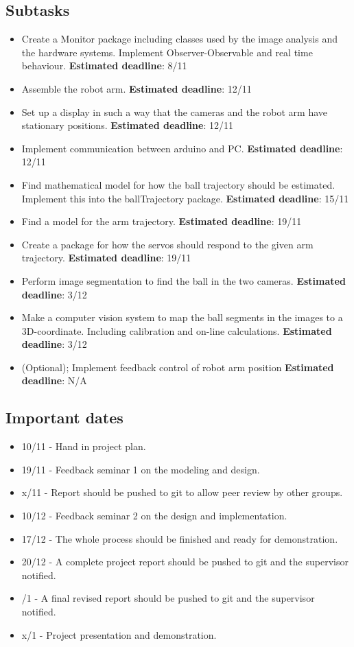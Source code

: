 \subsection{Subtasks}
    \begin{itemize}
        \item Create a Monitor package including classes used by the image analysis and the hardware systems. Implement Observer-Observable and real time behaviour. \textbf{Estimated deadline}: 8/11
        \item Assemble the robot arm. \textbf{Estimated deadline}: 12/11
        \item Set up a display in such a way that the cameras and the robot arm have stationary positions. \textbf{Estimated deadline}: 12/11
        \item Implement communication between arduino and PC. \textbf{Estimated deadline}: 12/11
        \item Find mathematical model for how the ball trajectory should be estimated. Implement this into the ballTrajectory package. \textbf{Estimated deadline}: 15/11
        \item Find a model for the arm trajectory. \textbf{Estimated deadline}: 19/11 
        
        \item Create a package for how the servos should respond to the given arm trajectory. \textbf{Estimated deadline}: 19/11
        \item Perform image segmentation to find the ball in the two cameras. \textbf{Estimated deadline}: 3/12
        \item Make a computer vision system to map the ball segments in the images to a 3D-coordinate. Including calibration and on-line calculations. \textbf{Estimated deadline}: 3/12
        \item (Optional); Implement feedback control of robot arm position \textbf{Estimated deadline}: N/A
    \end{itemize}
    
\subsection{Important dates}
    \begin{itemize}
        \item 10/11 -  Hand in project plan.
        \item 19/11 - Feedback seminar 1 on the modeling and design.
        \item x/11 - Report should be pushed to git to allow peer review by other groups.
        \item 10/12 - Feedback seminar 2 on the design and implementation.
        \item 17/12 - The whole process should be finished and ready for demonstration.
        \item 20/12 - A complete project report should be pushed to git and the supervisor notified.
        \item /1 - A final revised report should be pushed to git and the supervisor notified.
        \item x/1 - Project presentation and demonstration.
    \end{itemize}
